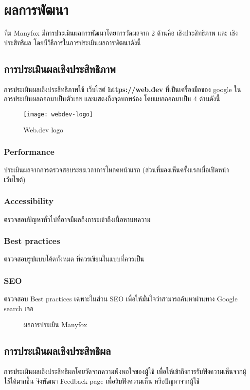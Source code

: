 \chapter{ผลการพัฒนา}
\label{chapter:result}

ทีม Manyfox มีการประเมินผลการพัฒนาโดยการวัดผลจาก 2 ด้านคือ เชิงประสิทธิภาพ และ เชิงประสิทธิผล
โดยมีวิธีการในการประเมินผลการพัฒนาดังนี้

\section{การประเมินผลเชิงประสิทธิภาพ}
การประเมินผลเชิงประสิทธิภาพใช้ เว็บไซต์ \textbf{https://web.dev} ที่เป็นเครื่องมือของ google ในการประเมินผลออกมาเป็นตัวเลข และแสดงถึงจุดบกพร่อง 
โดยแยกออกมาเป็น 4 ด้านดังนี้
\begin{figure}[!htbp]
	\centering
	\texttt{[image: webdev-logo]}
	\caption{Web.dev logo}
	\label{Fig:wed-dev}
\end{figure}
\subsection{Performance}
ประเมินผลจากการตรวจสอบระยะเวลาการโหลดหน้าแรก (ส่วนที่มองเห็นครั้งแรกเมื่อเปิดหน้าเว็บไซต์)
\subsection{Accessibility}
ตรวจสอบปัญหาทั่วไปที่อาจมีผลถึงการะเข้าถึงเนื้อหาบทความ
\subsection{Best practices}
ตรวจสอบรูปแบบโค้ดทั้งหมด ที่ควรเขียนในแบบที่ควรเป็น
\subsection{SEO}
ตรวจสอบ Best practices เฉพาะในส่วน SEO เพื่อให้มั่นใจว่าสามารถค้นหาผ่านทาง Google search เจอ
\newpage
\begin{figure}[!htbp]
	\centering
	\caption{ผลการประเมิน Manyfox}

\end{figure}

\section{การประเมินผลเชิงประสิทธิผล}
การประเมินผลเชิงประสิทธิผลโดยวัดจากความพึงพอใจของผู้ใช้ เพื่อให้เข้าถึงการรับฟังความเห็นจากผู้ใช้ได้มากขึ้น จึงพัฒนา Feedback page
เพื่อรับฟังความเห็น หรือปัญหาจากผู้ใช้